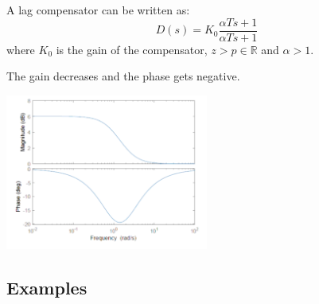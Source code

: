 A lag compensator can be written as:
$$D(s) = K_0 \frac{\alpha Ts+1}{\alpha Ts+1}$$
where $K_0$ is the gain of the compensator, $z>p \in \mathbb{R}$ and $\alpha > 1$.

The gain decreases and the phase gets negative.


\begin{center}
	\includegraphics[width=0.5\textwidth]{Images/lagComp.png}
\end{center}

\subsection{Examples}
